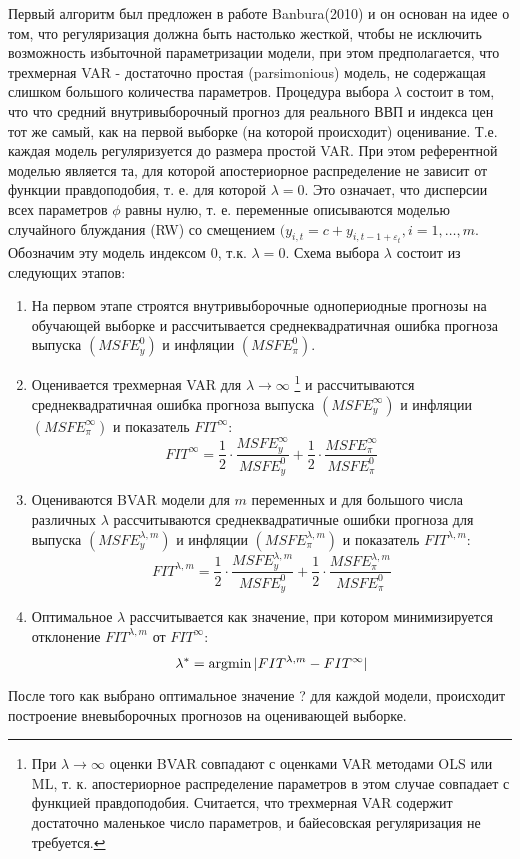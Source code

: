 \documentclass[11pt]{article} %
\newcommand{\argmin}{\operatornamewithlimits{argmin}}
\begin{document}
Первый алгоритм был предложен в работе Banbura(2010) и он основан на идее о том, что регуляризация должна быть настолько жесткой, чтобы не исключить возможность избыточной параметризации модели, при этом предполагается, что трехмерная VAR - достаточно простая (parsimonious) модель, не содержащая слишком большого количества параметров. Процедура выбора $\lambda$ состоит в том, что что средний внутривыборочный прогноз для реального ВВП и индекса цен тот же самый, как на первой выборке (на которой происходит) оценивание. Т.е. каждая модель регуляризуется до размера простой VAR. При этом  референтной моделью является та, для которой апостериорное распределение не зависит от функции правдоподобия, т. е. для которой $\lambda=0$. Это означает, что дисперсии всех параметров $\phi$ равны нулю, т. е. переменные описываются моделью случайного блуждания (RW) со смещением $(y_{i,t}=c+y_{i,t-1 +\varepsilon_t}, i=1,\ldots,m$. Обозначим эту модель индексом 0,  т.к. $\lambda=0$.
Схема выбора $\lambda$ состоит из следующих этапов:
\begin{enumerate}
\item На первом этапе  строятся внутривыборочные однопериодные прогнозы на обучающей выборке и рассчитывается среднеквадратичная ошибка прогноза выпуска $(MSFE_y^{0})$ и инфляции $(MSFE_{\pi}^{0})$.
\item Оценивается трехмерная VAR для $\lambda\to \infty$ \footnote{При $\lambda\to \infty$ оценки BVAR совпадают с оценками VAR методами OLS или ML, т. к. апостериорное распределение параметров в этом случае совпадает с функцией правдоподобия. Считается, что трехмерная VAR содержит достаточно маленькое число параметров, и байесовская регуляризация не требуется.} и рассчитываются среднеквадратичная ошибка прогноза выпуска $(MSFE_y^{\infty})$ и инфляции $(MSFE_{\pi}^{\infty})$ и показатель $FIT^{\infty}$:
\begin{equation}
FIT^{\infty}=\frac{1}{2}\cdot\frac{MSFE_y^{\infty}}{MSFE^0_y} + \frac{1}{2}\cdot\frac{MSFE_{\pi}^{\infty}}{MSFE^0_{\pi}}
\end{equation}
\item Оцениваются BVAR модели для $m$ переменных и для большого числа различных $\lambda$ рассчитываются среднеквадратичные ошибки прогноза для выпуска $(MSFE_y^{\lambda,m})$ и инфляции $(MSFE_{\pi}^{\lambda,m})$ и показатель $FIT^{{\lambda,m}}$: 
\begin{equation}
FIT^{\lambda,m}=\frac{1}{2}\cdot\frac{MSFE_y^{\lambda,m}}{MSFE^0_y} + \frac{1}{2}\cdot\frac{MSFE_{\pi}^{\lambda,m}}{MSFE^0_{\pi}}
\end{equation}
\item Оптимальное $\lambda$ рассчитывается как значение, при котором минимизируется отклонение $FIT^{\lambda,m}$ от $FIT^{\infty}$:
\begin{equation}
\lambda^*=\argmin |FIT^{\lambda, m}-FIT^{\infty}| 
\end{equation}
\end{enumerate}
После того как выбрано оптимальное значение ? для каждой модели, происходит построение вневыборочных прогнозов на оценивающей выборке.
\end{document}
